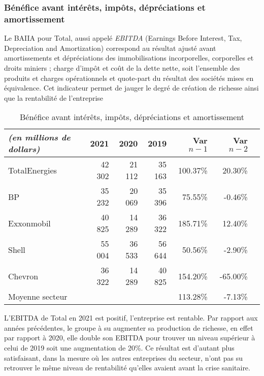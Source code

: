 \documentclass[12pt]{article}
\begin{document}
\subsubsection{Bénéfice avant intérêts, impôts, dépréciations et amortissement}
Le BAIIA pour Total, aussi appelé \textit{EBITDA} (Earnings Before Interest, Tax, Depreciation and Amortization) correspond au résultat ajusté avant amortissements et dépréciations des immobilisations incorporelles, corporelles et droits miniers ; charge d'impôt et coût de la dette nette, soit l'ensemble des produits et charges opérationnels et quote-part du résultat des sociétés mises en équivalence. Cet indicateur permet de jauger le degré de création de richesse ainsi que la rentabilité de l'entreprise
\begin{table}[H]
    \sffamily
    \centering
    \caption{Bénéfice avant intérêts, impôts, dépréciations et amortissement}
    \label{table:EBITDA}
    \begin{tabular}{l*{1}{rrrrrr}}
    \toprule
        \textit{(en millions de dollars)} & \textbf{2021} & 2020 & 2019 & Var $n-1$ & Var $n-2$ \\
    \midrule
        TotalEnergies & 42 302	& 21 112 & 35 163  & 100.37\% & 20.30\% \\
    \midrule
        BP              &   35 232  &   20 069  &   35 396  &   75.55\%	&   -0.46\%  \\
        Exxonmobil	    &   40 825  &   14 289  &   36 322	 &   185.71\%   &   12.40\%  \\
        Shell           &   55 004  &   36 533  &   56 644  &   50.56\%	&   -2.90\%  \\
        Chevron	        &   36 322  &   14 289  &   40 825  &   154.20\%   &   -65.00\% \\
    \midrule
        Moyenne secteur	&   ~      &        ~ &    ~	 &	113.28\%	&   -7.13\%  \\
    \bottomrule
    \end{tabular}
\end{table}
L'EBITDA de Total en 2021 est positif, l'entreprise est rentable. Par rapport aux années précédentes, le 
groupe à su augmenter sa production de richesse, en effet par rapport à 2020, elle double son EBITDA pour
trouver un niveau supérieur à celui de 2019 soit une augmentation de 20\%. Ce résultat est d'autant plus  
satisfaisant, dans la mesure où les autres entreprises du secteur, n'ont pas su retrouver le même niveau de
rentabilité qu'elles avaient avant la crise sanitaire.
\end{document}
